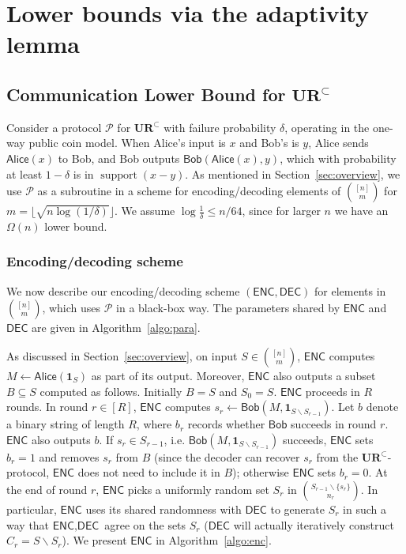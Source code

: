 \documentclass[11pt]{article}
\newcommand{\supp}{\mathop{support}}
\newcommand{\enc}{\textsf{ENC}\xspace}
\newcommand{\dec}{\textsf{DEC}\xspace}
\newcommand{\sketch}{\mathsf{Alice}}
\newcommand{\query}{\mathsf{Bob}}
\newcommand{\ur}{\mathbf{UR}\xspace}
\begin{document}
\section{Lower bounds via the adaptivity lemma}\label{sec:adaptive-proof}
\subsection{Communication Lower Bound for $\ur^\subset$} \label{sec:optimal-lb}

Consider a protocol $\mathcal{P}$ for $\ur^\subset$ with failure probability $\delta$, operating in the one-way public coin model. When Alice's input is $x$ and Bob's is $y$, Alice sends $\sketch(x)$ to Bob, and Bob outputs $\query(\sketch(x), y)$, which with probability at least $1-\delta$ is in $\supp(x-y)$. As mentioned in Section~\ref{sec:overview}, we use $\mathcal{P}$ as a subroutine in a scheme for encoding/decoding elements of $\binom{[n]}m$ for $m = \lfloor \sqrt{n\log(1/\delta)}\rfloor$. We assume $\log \frac 1{\delta} \le n/64$, since for larger $n$ we have an $\Omega(n)$ lower bound.

\subsubsection{Encoding/decoding scheme}
We now describe our encoding/decoding scheme $(\enc, \dec)$ for elements in ${[n] \choose m}$, which uses $\mathcal{P}$ in a black-box way. The parameters shared by $\enc$ and $\dec$ are given in Algorithm~\ref{algo:para}.

As discussed in Section~\ref{sec:overview}, on input $S\in {[n] \choose m}$, $\enc$ computes $M \leftarrow \sketch(\mathbf{1}_S)$ as part of its output. Moreover, $\enc$ also outputs a subset $B\subseteq S$ computed as follows. Initially $B=S$ and $S_0=S$. $\enc$ proceeds in $R$ rounds.  In round $r\in[R]$, $\enc$ computes $s_r\leftarrow \query(M, \mathbf{1}_{S\backslash S_{r-1}})$.  Let $b$ denote a binary string of length $R$, where $b_r$ records whether $\query$ succeeds in round $r$.  $\enc$ also outputs $b$.  If $s_r\in S_{r-1}$, i.e. $\query(M, \mathbf{1}_{S\backslash S_{r-1}})$ succeeds, $\enc$ sets $b_r=1$ and removes $s_r$ from $B$ (since the decoder can recover $s_r$ from the $\ur^\subset$-protocol, $\enc$ does not need to include it in $B$); otherwise $\enc$ sets $b_r=0$.  At the end of round $r$, $\enc$ picks a uniformly random set $S_r$ in $\binom{S_{r-1}\backslash \{s_r\}}{n_r}$.  In particular, $\enc$ uses its shared randomness with $\dec$ to generate $S_r$ in such a way that $\enc, \dec$ agree on the sets $S_r$ ($\dec$ will actually iteratively construct $C_r = S\backslash S_r$). We present $\enc$ in Algorithm~\ref{algo:enc}.
\end{document}
